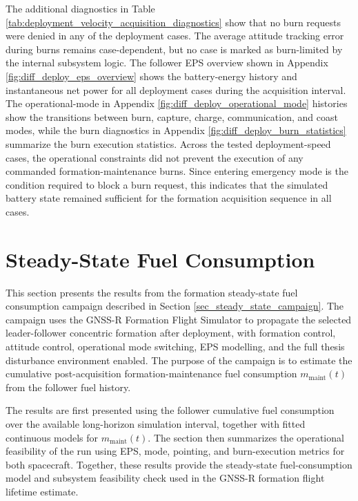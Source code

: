 The additional diagnostics in Table \ref{tab:deployment_velocity_acquisition_diagnostics} show that no burn requests were denied in any of the deployment cases. The average attitude tracking error during burns remains case-dependent, but no case is marked as burn-limited by the internal subsystem logic. The follower EPS overview shown in Appendix \ref{fig:diff_deploy_eps_overview} shows the battery-energy history and instantaneous net power for all deployment cases during the acquisition interval. The operational-mode in Appendix \ref{fig:diff_deploy_operational_mode} histories show the transitions between burn, capture, charge, communication, and coast modes, while the burn diagnostics in Appendix \ref{fig:diff_deploy_burn_statistics} summarize the burn execution statistics. Across the tested deployment-speed cases, the operational constraints did not prevent the execution of any commanded formation-maintenance burns. Since entering emergency mode is the condition required to block a burn request, this indicates that the simulated battery state remained sufficient for the formation acquisition sequence in all cases.




\section{Steady-State Fuel Consumption}
This section presents the results from the formation steady-state fuel consumption campaign described in Section \ref{sec_steady_state_campaign}. The campaign uses the GNSS-R Formation Flight Simulator to propagate the selected leader-follower concentric formation after deployment, with formation control, attitude control, operational mode switching, EPS modelling, and the full thesis disturbance environment enabled. The purpose of the campaign is to estimate the cumulative post-acquisition formation-maintenance fuel consumption $m_{\mathrm{maint}}(t)$ from the follower fuel history.

The results are first presented using the follower cumulative fuel consumption over the available long-horizon simulation interval, together with fitted continuous models for $m_{\mathrm{maint}}(t)$. The section then summarizes the operational feasibility of the run using EPS, mode, pointing, and burn-execution metrics for both spacecraft. Together, these results provide the steady-state fuel-consumption model and subsystem feasibility check used in the GNSS-R formation flight lifetime estimate.

